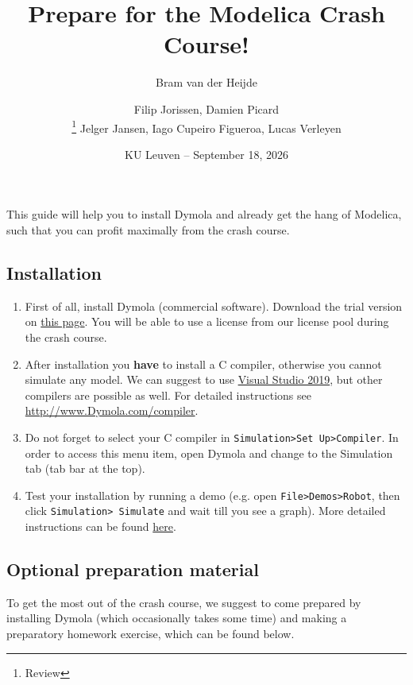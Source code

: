 \documentclass[10pt,a4paper]{article}
\author{Bram van der Heijde}
\begin{document}
	
	\title{Prepare for the Modelica Crash Course!}
	\author{Filip Jorissen, Damien Picard\\ \thanks{Review} Jelger Jansen, Iago Cupeiro Figueroa, Lucas Verleyen} 
	\date{KU Leuven -- September 18, 2026}
	\maketitle

This guide will help you to install Dymola and already get the hang of Modelica, such that you can profit maximally from the crash course. 

\subsection*{Installation}

\begin{enumerate}
	\item First of all, install Dymola (commercial software).  Download the trial version on
	\href{https://www.3ds.com/products-services/catia/products/dymola/trial-version/}{this page}. You will be able to use a license from our license pool during the crash course. 
	\item After installation you \textbf{have} to install a C compiler, otherwise you 
	cannot simulate any model. We can suggest to use \href{https://visualstudio.microsoft.com/fr/vs/older-downloads/}{Visual Studio 2019}, but other compilers are possible as well. For detailed instructions see
	\href{http://www.Dymola.com/compiler}{http://www.Dymola.com/compiler}. 
	\item Do not forget to select your C compiler in \texttt{Simulation>Set Up>Compiler}. In order to access this menu item, open Dymola and change to the Simulation tab (tab bar at the top).
	\item Test your installation by running a demo (e.g. open \texttt{File>Demos>Robot}, then 
	click \texttt{Simulation> Simulate} and wait till you see a graph). More detailed instructions can be found \href{https://www.3ds.com/fileadmin/PRODUCTS/CATIA/DYMOLA/PDF/Installation.pdf}{here}.
\end{enumerate}


\subsection*{Optional preparation material}
To get the most out of the crash course, we suggest to come prepared by installing Dymola (which occasionally takes some time) and making a preparatory homework exercise, which can be found below. 
\end{document}
